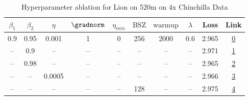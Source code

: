 \begin{table}[H]
\centering
\caption{Hyperparameter ablation for Lion on 520m on 4x Chinchilla Data}
\label{tab:ablation_lion_520m_on_4x_chinchilla_data}
\begin{tabular}{cccccccccc}
\toprule
$\beta_1$ & $\beta_2$ & $\eta$ & $\gradnorm$ & $\eta_{min}$ & $\mathrm{BSZ}$ & $\mathrm{warmup}$ & $\lambda$ & Loss & Link \\
\midrule
0.9 & 0.95 & 0.001 & 1 & 0 & 256 & 2000 & 0.6 & 2.965 & \href{https://wandb.ai/stanford-mercury/optimizer-scaling/runs/sweep-520m-42B-lion30535dlr0.001-wd0.6-minlr0-warmup2000-b10.9-b-b687e1}{0} \\
\midrule
-- & 0.9 & -- & -- & -- & -- & -- & -- & 2.971 & \href{https://wandb.ai/stanford-mercury/optimizer-scaling/runs/sweep-520m-42B-lion6d497blr0.001-wd0.6-minlr0-warmup2000-b10.9-b-d19dd3}{1} \\
-- & 0.98 & -- & -- & -- & -- & -- & -- & 2.965 & \href{https://wandb.ai/stanford-mercury/optimizer-scaling/runs/sweep-520m-42B-lion70e78flr0.001-wd0.6-minlr0-warmup2000-b10.9-b-fa40d0}{2} \\
-- & -- & 0.0005 & -- & -- & -- & -- & -- & 2.966 & \href{https://wandb.ai/stanford-mercury/optimizer-scaling/runs/sweep-520m-42B-lion9e353dlr0.0005-wd0.6-minlr0-warmup2000-b10.9--e8f576}{3} \\
-- & -- & -- & -- & -- & 128 & -- & -- & 2.975 & \href{https://wandb.ai/stanford-mercury/optimizer-scaling/runs/sweep-520m-42B-lion2b623elr0.001-wd0.6-minlr0-warmup2000-b10.9-b-f4b0ad}{4} \\
\bottomrule
\end{tabular}
\end{table}

